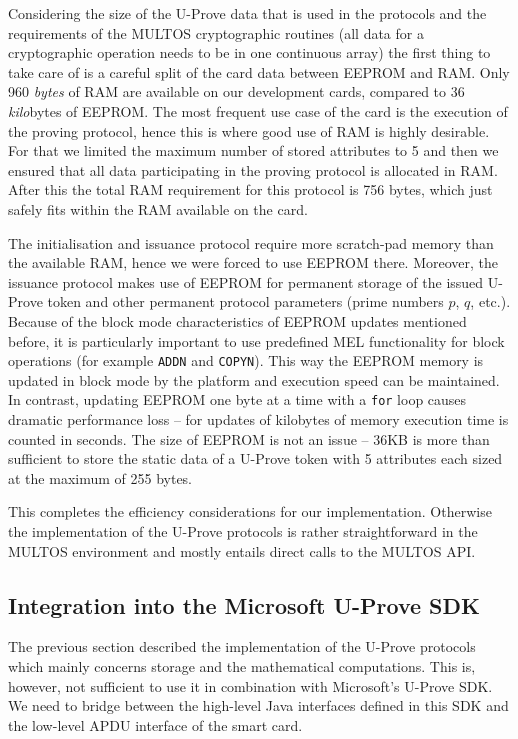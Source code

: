 Considering the size of the U-Prove data that is used in the protocols and the
requirements of the MULTOS cryptographic routines (all data for a cryptographic
operation needs to be in one continuous array) the first thing to take care of
is a careful split of the card data between EEPROM and RAM. Only 960
\emph{bytes} of RAM are available on our development cards, compared to
36 \emph{kilo}bytes of EEPROM. The most frequent use case of the card is the
execution of the proving protocol, hence this is where good use of RAM is highly
desirable. For that we limited the maximum number of stored attributes to 5 and
then we ensured that all data participating in the proving protocol is allocated
in RAM. After this the total RAM requirement for this protocol is 756 bytes,
which just safely fits within the RAM available on the card.

The initialisation and issuance protocol require more scratch-pad memory than
the available RAM, hence we were forced to use EEPROM there. Moreover, the
issuance protocol makes use of EEPROM for permanent storage of the issued
U-Prove token and other permanent protocol parameters (prime numbers $p$, $q$,
etc.). Because of the block mode characteristics of EEPROM updates mentioned
before, it is particularly important to use predefined MEL functionality for
block operations (for example \lstinline{ADDN} and \lstinline{COPYN}). This
way the EEPROM memory is updated in block mode by the platform and execution
speed can be maintained. In contrast, updating EEPROM one byte at a time with a
\lstinline{for} loop causes dramatic performance loss -- for updates of
kilobytes of memory execution time is counted in seconds. The size of EEPROM is
not an issue -- 36KB is more than sufficient to store the static data of a
U-Prove token with 5 attributes each sized at the maximum of 255 bytes.

This completes the efficiency considerations for our implementation. Otherwise
the implementation of the U-Prove protocols is rather straightforward in the
MULTOS environment and mostly entails direct calls to the MULTOS API.

\subsection{Integration into the Microsoft U-Prove SDK}

The previous section described the implementation of the U-Prove protocols which
mainly concerns storage and the mathematical computations. This is, however, not
sufficient to use it in combination with Microsoft's U-Prove SDK. We need to
bridge between the high-level Java interfaces defined in this SDK and the
low-level APDU interface of the smart card.

